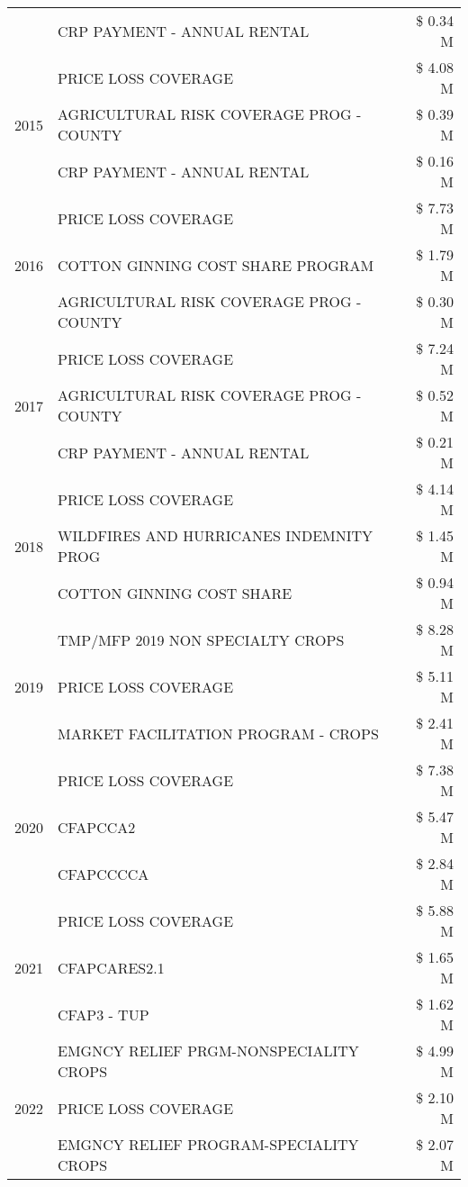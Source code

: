 \begin{tabular}{llr}
 & CRP PAYMENT - ANNUAL RENTAL & \$ 0.34 M \\
\cline{1-3}
\multirow[t]{3}{*}{2015} & PRICE LOSS COVERAGE & \$ 4.08 M \\
 & AGRICULTURAL RISK COVERAGE PROG - COUNTY & \$ 0.39 M \\
 & CRP PAYMENT - ANNUAL RENTAL & \$ 0.16 M \\
\cline{1-3}
\multirow[t]{3}{*}{2016} & PRICE LOSS COVERAGE & \$ 7.73 M \\
 & COTTON GINNING COST SHARE PROGRAM & \$ 1.79 M \\
 & AGRICULTURAL RISK COVERAGE PROG - COUNTY & \$ 0.30 M \\
\cline{1-3}
\multirow[t]{3}{*}{2017} & PRICE LOSS COVERAGE & \$ 7.24 M \\
 & AGRICULTURAL RISK COVERAGE PROG - COUNTY & \$ 0.52 M \\
 & CRP PAYMENT - ANNUAL RENTAL & \$ 0.21 M \\
\cline{1-3}
\multirow[t]{3}{*}{2018} & PRICE LOSS COVERAGE & \$ 4.14 M \\
 & WILDFIRES AND HURRICANES INDEMNITY PROG & \$ 1.45 M \\
 & COTTON GINNING COST SHARE & \$ 0.94 M \\
\cline{1-3}
\multirow[t]{3}{*}{2019} & TMP/MFP 2019 NON SPECIALTY CROPS & \$ 8.28 M \\
 & PRICE LOSS COVERAGE & \$ 5.11 M \\
 & MARKET FACILITATION PROGRAM - CROPS & \$ 2.41 M \\
\cline{1-3}
\multirow[t]{3}{*}{2020} & PRICE LOSS COVERAGE & \$ 7.38 M \\
 & CFAPCCA2 & \$ 5.47 M \\
 & CFAPCCCCA & \$ 2.84 M \\
\cline{1-3}
\multirow[t]{3}{*}{2021} & PRICE LOSS COVERAGE & \$ 5.88 M \\
 & CFAPCARES2.1 & \$ 1.65 M \\
 & CFAP3 - TUP & \$ 1.62 M \\
\cline{1-3}
\multirow[t]{3}{*}{2022} & EMGNCY RELIEF PRGM-NONSPECIALITY CROPS & \$ 4.99 M \\
 & PRICE LOSS COVERAGE & \$ 2.10 M \\
 & EMGNCY RELIEF PROGRAM-SPECIALITY CROPS & \$ 2.07 M \\
\cline{1-3}
\bottomrule
\end{tabular}
